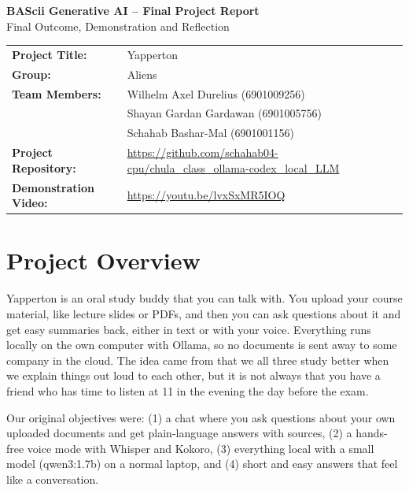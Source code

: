 \documentclass[11pt,a4paper]{article}
\newcommand{\videourl}{https://youtu.be/lvxSxMR5IOQ}
\begin{document}
\begin{center}
  {\Large\bfseries BAScii Generative AI -- Final Project Report}\\[0.4em]
  {\large Final Outcome, Demonstration and Reflection}
\end{center}

\vspace{1em}

\begin{tabular}{@{}lp{10.8cm}@{}}
  \textbf{Project Title:}      & Yapperton \\
  \textbf{Group:}              & Aliens \\
  \textbf{Team Members:}       & Wilhelm Axel Durelius (6901009256) \\
                               & Shayan Gardan Gardawan (6901005756) \\
                               & Schahab Bashar-Mal (6901001156) \\
  \textbf{Project Repository:} & \url{https://github.com/schahab04-cpu/chula_class_ollama-codex_local_LLM} \\
  \textbf{Demonstration Video:} & \url{\videourl} \\
\end{tabular}

\vspace{2em}

\section{Project Overview}

Yapperton is an oral study buddy that you can talk with. You upload your course
material, like lecture slides or PDFs, and then you can ask questions about it
and get easy summaries back, either in text or with your voice. Everything runs
locally on the own computer with Ollama, so no documents is sent away to some
company in the cloud. The idea came from that we all three study better when we
explain things out loud to each other, but it is not always that you have a
friend who has time to listen at 11 in the evening the day before the exam.

Our original objectives were: (1) a chat where you ask questions about your own
uploaded documents and get plain-language answers with sources, (2) a
hands-free voice mode with Whisper and Kokoro, (3) everything local with a small
model (qwen3:1.7b) on a normal laptop, and (4) short and easy answers that feel
like a conversation.
\end{document}
